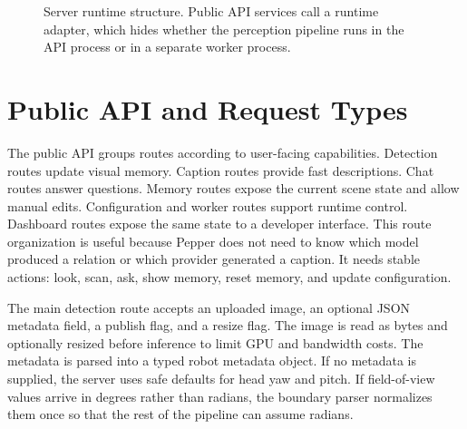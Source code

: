 \begin{figure}[t]
\centering
{}
\caption{Server runtime structure. Public API services call a runtime adapter, which hides whether the perception pipeline runs in the API process or in a separate worker process.}
\label{fig:server-runtime-structure}
\end{figure}

\section{Public API and Request Types}\label{sec:server-public-api}

The public API groups routes according to user-facing capabilities. Detection routes update visual memory. Caption routes provide fast descriptions. Chat routes answer questions. Memory routes expose the current scene state and allow manual edits. Configuration and worker routes support runtime control. Dashboard routes expose the same state to a developer interface. This route organization is useful because Pepper does not need to know which model produced a relation or which provider generated a caption. It needs stable actions: look, scan, ask, show memory, reset memory, and update configuration.

The main detection route accepts an uploaded image, an optional JSON metadata field, a publish flag, and a resize flag. The image is read as bytes and optionally resized before inference to limit GPU and bandwidth costs. The metadata is parsed into a typed robot metadata object. If no metadata is supplied, the server uses safe defaults for head yaw and pitch. If field-of-view values arrive in degrees rather than radians, the boundary parser normalizes them once so that the rest of the pipeline can assume radians.

